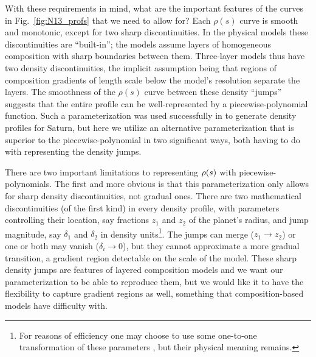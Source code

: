 With these requirements in mind, what are the important features of the curves
in Fig.~\ref{fig:N13_profs} that we need to allow for? Each $\rho(s)$ curve is
smooth and monotonic, except for two sharp discontinuities. In the physical
models these discontinuities are ``built-in''; the models assume layers of
homogeneous composition with sharp boundaries between them. Three-layer models
thus have two density discontinuities, the implicit assumption being that
regions of composition gradients of length scale below the model's resolution
separate the layers. The smoothness of the $\rho(s)$ curve between these density
``jumps'' suggests that the entire profile can be well-represented by a
piecewise-polynomial function. Such a parameterization was used successfully in
\citep{Movshovitz2020} to generate density profiles for Saturn, but here we
utilize an alternative parameterization that is superior to the
piecewise-polynomial in two significant ways, both having to do with
representing the density jumps.

There are two important limitations to representing $\rho(s)$ with
piecewise-polynomials. The first and more obvious is that this parameterization
only allows for sharp density discontinuities, not gradual ones. There are two
mathematical discontinuities (of the first kind) in every density profile, with
parameters controlling their location, say fractions $z_1$ and $z_2$ of the
planet's radius, and jump magnitude, say $\delta_1$ and $\delta_2$ in density
units\footnote{For reasons of efficiency one may choose to use some one-to-one
transformation of these parameters \citep[e.g.][Appendix B]{Movshovitz2020}, but
their physical meaning remains.}. The jumps can merge ($z_1\to{}z_2$) or one or
both may vanish ($\delta_i\to{0}$), but they cannot approximate a more gradual
transition, a gradient region detectable on the scale of the model. These sharp
density jumps are features of layered composition models and we want our
parameterization to be able to reproduce them, but we would like it to have the
flexibility to capture gradient regions as well, something that
composition-based models have difficulty with.

